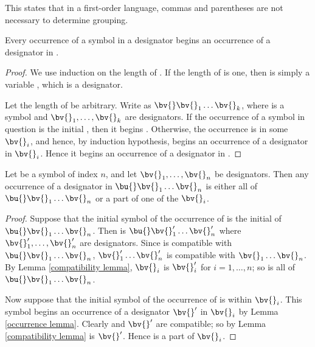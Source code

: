 \begin{remark}
    This states that in a first-order language, commas and parentheses are not necessary to determine grouping.
\end{remark}

\begin{lemma}\label{occurrence lemma}
    Every occurrence of a symbol in a designator \bu{} begins an occurrence of a designator in \bu{}.
\end{lemma}

\begin{proof}
    We use induction on the length of \bu{}.
    If the length of \bu{} is one, then \bu{} is simply a variable \x{}, which is a designator.
    
    Let the length of \bu{} be arbitrary.
    Write \bu{} as $\bv{} \bv{}_1 \dots \bv{}_k$, where \bv{} is a symbol and $\bv{}_1, \dots, \bv{}_k$ are designators.
    If the occurrence of a symbol in question is the initial \bv{}, then it begins \bu{}.
    Otherwise, the occurrence is in some $\bv{}_i$, and hence, by induction hypothesis, begins an occurrence of a designator in $\bv{}_i$.
    Hence it begins an occurrence of a designator in \bu{}.
\end{proof}

\begin{theorem}\label{occurrence theorem}
    Let \bu{} be a symbol of index $n$, and let $\bv{}_1, \dots, \bv{}_n$ be designators.
    Then any occurrence of a designator \bv{} in $\bu{} \bv{}_1 \dots \bv{}_n$ is either all of $\bu{} \bv{}_1 \dots \bv{}_n$ or a part of one of the $\bv{}_i$.
\end{theorem}

\begin{proof}
    Suppose that the initial symbol of the occurrence of \bv{} is the initial \bu{} of $\bu{} \bv{}_1 \dots \bv{}_n$.
    Then \bv{} is $\bu{} \bv{}_1' \dots \bv{}_n'$ where $\bv{}_1', \dots, \bv{}_n'$ are designators.
    Since \bv{} is compatible with $\bu{} \bv{}_1 \dots \bv{}_n$, $\bv{}_1' \dots \bv{}_n'$ is compatible with $\bv{}_1 \dots \bv{}_n$.
    By Lemma \eqref{compatibility lemma}, $\bv{}_i$ is $\bv{}_i'$ for $i = 1, \dots, n$;
    so \bv{} is all of $\bu{} \bv{}_1 \dots \bv{}_n$.
    
    Now suppose that the initial symbol of the occurrence of \bv{} is within $\bv{}_i$.
    This symbol begins an occurrence of a designator $\bv{}'$ in $\bv{}_i$ by Lemma \eqref{occurrence lemma}.
    Clearly \bv{} and $\bv{}'$ are compatible;
    so by Lemma \eqref{compatibility lemma} \bv{} is $\bv{}'$.
    Hence \bv{} is a part of $\bv{}_i$.
\end{proof}

